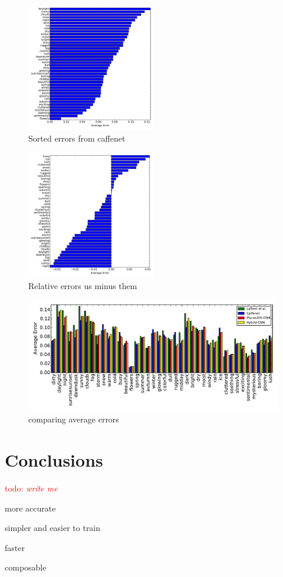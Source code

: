 \documentclass{article}
\newcommand{\todo}[1]{\textcolor{red}{todo: {\em #1}}}
\begin{document}
%
%
%


\begin{figure}[t]
	\centering
		\includegraphics[width=0.5\textwidth]{figs/sorted_err.pdf}
		\caption{Sorted errors from caffenet}\label{fig:sort}
\end{figure}

\begin{figure}[t]
	\centering
		\includegraphics[width=0.5\textwidth]{figs/rel_err.pdf}
		\caption{Relative errors us minus them}\label{fig:relerr}
\end{figure}

\begin{figure}[t]
	\centering
		\includegraphics[width=1.0\textwidth]{figs/avg_err_compare.pdf}
		\caption{comparing average errors}\label{fig:compare}
\end{figure}

\section{Conclusions}

\todo{write me}

more accurate

simpler and easier to train

faster

composable



\end{document}

